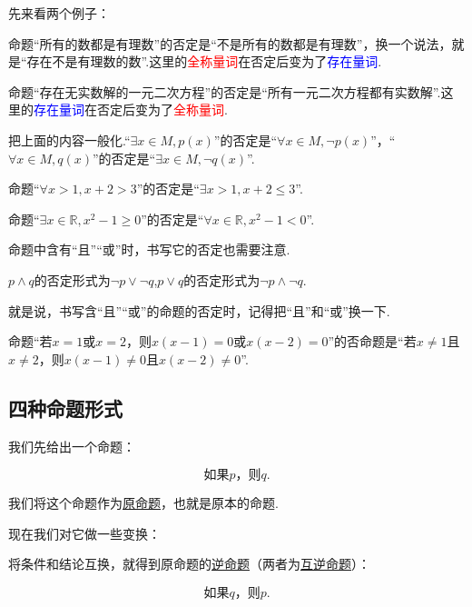 \documentclass[lang=cn,math=cm,chinesefont=nofont,11pt,scheme=chinese,twocol]{elegantbook}
\begin{document}
先来看两个例子：

命题“所有的数都是有理数”的否定是“不是所有的数都是有理数”，换一个说法，就是“存在不是有理数的数”.这里的\textcolor{red}{全称量词}在否定后变为了\textcolor{blue}{存在量词}.

命题“存在无实数解的一元二次方程”的否定是“所有一元二次方程都有实数解”.这里的\textcolor{blue}{存在量词}在否定后变为了\textcolor{red}{全称量词}.

把上面的内容一般化.“$\exists x\in M, p(x)$”的否定是“$\forall x{\in}M,\neg p(x)$”，“$\forall x\in M, q(x)$”的否定是“$\exists x{\in}M, \neg q(x)$”.

\begin{example}
  命题“$\forall x>1,x+2>3$”的否定是“$\exists x>1,x+2\leqslant 3$”.
\end{example}

\begin{example}
  命题“$\exists x\in\mathbb{R},x^2-1\geqslant 0$”的否定是“$\forall x\in\mathbb{R},x^2-1<0$”.
\end{example}

命题中含有“且”“或”时，书写它的否定也需要注意.

$p\land q$的否定形式为$\lnot p\lor \lnot q$,$p\lor q$的否定形式为$\lnot p\land \lnot q$.

就是说，书写含“且”“或”的命题的否定时，记得把“且”和“或”换一下.

\begin{example}
  命题“若$x=1$或$x=2$，则$x(x-1)=0$或$x(x-2)=0$”的否命题是“若$x\neq 1$且$x\neq 2$，则$x(x-1)\neq 0$且$x(x-2)\neq 0$”.
\end{example}

\subsection{四种命题形式}

我们先给出一个命题：

\begin{equation}\label{YuanMingTi}
  \text{如果}p\text{，则}q.
\end{equation}

我们将这个命题作为\underline{原命题}，也就是原本的命题.

现在我们对它做一些变换：

将条件和结论互换，就得到原命题的\underline{逆命题}（两者为\underline{互逆命题}）：

\begin{equation}\label{NiMingTi}
  \text{如果}q\text{，则}p.
\end{equation}
\end{document}
